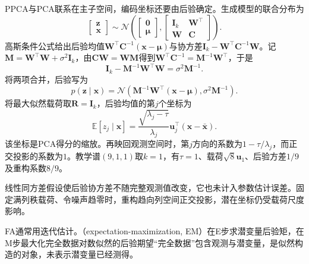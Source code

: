 PPCA与PCA联系在主子空间，编码坐标还要由后验确定。生成模型的联合分布为
\begin{equation}
\label{eq:dim-ppca-joint}
\begin{bmatrix}\bm{z}\\ \bm{x}\end{bmatrix}
\sim\mathcal{N}\left(
\begin{bmatrix}\bm{0}\\ \bm{\mu}\end{bmatrix},
\begin{bmatrix}
\bm{I}_k&\bm{W}^\top\\
\bm{W}&\bm{C}
\end{bmatrix}\right).
\end{equation}
高斯条件公式给出后验均值$\bm{W}^\top\bm{C}^{-1}(\bm{x}-\bm{\mu})$与协方差$\bm{I}_k-\bm{W}^\top\bm{C}^{-1}\bm{W}$。记$\bm{M}=\bm{W}^\top\bm{W}+\sigma^2\bm{I}_k$，由$\bm{C}\bm{W}=\bm{W}\bm{M}$得到$\bm{W}^\top\bm{C}^{-1}=\bm{M}^{-1}\bm{W}^\top$，于是
\[
\bm{I}_k-\bm{M}^{-1}\bm{W}^\top\bm{W}
=\sigma^2\bm{M}^{-1}.
\]
将两项合并，后验写为
\begin{equation}
\label{eq:dim-ppca-posterior}
p(\bm{z}\mid\bm{x})
=\mathcal{N}\left(
\bm{M}^{-1}\bm{W}^\top(\bm{x}-\bm{\mu}),
\sigma^2\bm{M}^{-1}\right).
\end{equation}
将最大似然载荷取$\bm{R}=\bm{I}_k$，后验均值的第$j$个坐标为
\begin{equation}
\label{eq:dim-ppca-score}
\mathbb{E}[z_j\mid\bm{x}]
=\frac{\sqrt{\lambda_j-\tau}}{\lambda_j}
\bm{u}_j^\top(\bm{x}-\bar{\bm{x}}).
\end{equation}
该坐标是PCA得分的缩放。再映回观测空间时，第$j$方向的系数为$1-\tau/\lambda_j$，而正交投影的系数为$1$。教学谱$(9,1,1)$取$k=1$，有$\tau=1$、载荷$\sqrt8\bm{u}_1$、后验方差$1/9$及重构系数$8/9$。

线性同方差假设使后验协方差不随完整观测值改变，它也未计入参数估计误差。固定满列秩载荷、令噪声趋零时，重构趋向列空间正交投影，潜在坐标仍受载荷尺度影响。

FA通常用迭代估计。（expectation-maximization, EM）在E步求潜变量后验矩，在M步最大化完全数据对数似然的后验期望“完全数据”包含观测与潜变量，是似然构造的对象，未表示潜变量已经测得。

